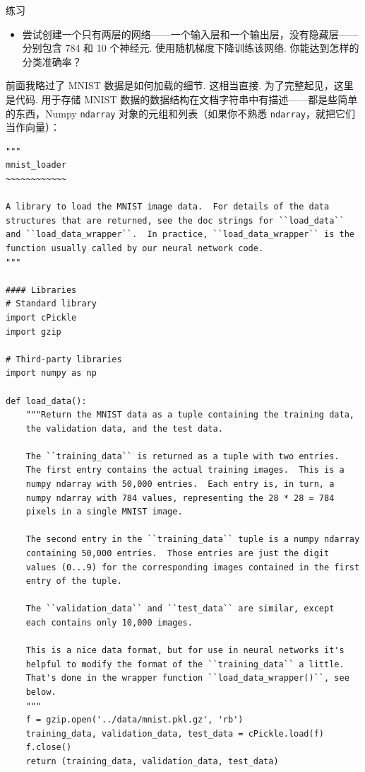 \begin{exerciseBox}{练习}

\begin{itemize}

\item 尝试创建一个只有两层的网络——一个输入层和一个输出层，没有隐藏层——分别包含 784 和 10 个神经元. 使用随机梯度下降训练该网络. 你能达到怎样的分类准确率？

\end{itemize}

前面我略过了 MNIST 数据是如何加载的细节. 这相当直接. 为了完整起见，这里是代码. 用于存储 MNIST 数据的数据结构在文档字符串中有描述——都是些简单的东西，Numpy \texttt{ndarray} 对象的元组和列表（如果你不熟悉 \texttt{ndarray}，就把它们当作向量）：

\begin{lstlisting}
"""
mnist_loader
~~~~~~~~~~~~

A library to load the MNIST image data.  For details of the data
structures that are returned, see the doc strings for ``load_data``
and ``load_data_wrapper``.  In practice, ``load_data_wrapper`` is the
function usually called by our neural network code.
"""

#### Libraries
# Standard library
import cPickle
import gzip

# Third-party libraries
import numpy as np

def load_data():
    """Return the MNIST data as a tuple containing the training data,
    the validation data, and the test data.

    The ``training_data`` is returned as a tuple with two entries.
    The first entry contains the actual training images.  This is a
    numpy ndarray with 50,000 entries.  Each entry is, in turn, a
    numpy ndarray with 784 values, representing the 28 * 28 = 784
    pixels in a single MNIST image.

    The second entry in the ``training_data`` tuple is a numpy ndarray
    containing 50,000 entries.  Those entries are just the digit
    values (0...9) for the corresponding images contained in the first
    entry of the tuple.

    The ``validation_data`` and ``test_data`` are similar, except
    each contains only 10,000 images.

    This is a nice data format, but for use in neural networks it's
    helpful to modify the format of the ``training_data`` a little.
    That's done in the wrapper function ``load_data_wrapper()``, see
    below.
    """
    f = gzip.open('../data/mnist.pkl.gz', 'rb')
    training_data, validation_data, test_data = cPickle.load(f)
    f.close()
    return (training_data, validation_data, test_data)


\end{lstlisting}
\end{exerciseBox}
